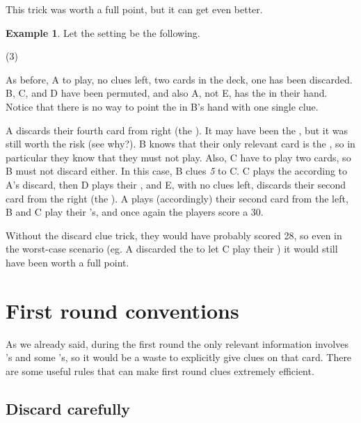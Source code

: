 \documentclass[a4paper]{article}
\theoremstyle{plain}
\theoremstyle{definition}
\newtheorem{example}[theorem]{Example}
\begin{document}
This trick was worth a full point, but it can get even better. 

\begin{example}
	
	Let the setting be the following.
	
	\begin{tasks}(3)
		\task[+]      
		\task[A]    
		\task[B]    
		\task[C]    
		\task[D]    
		\task[E]    
	\end{tasks}
	
	As before, A to play, no clues left, two cards in the deck, one  has been discarded. B, C, and D have been permuted, and also A, not E, has the  in their hand. Notice that there is no way to point the  in B's hand with one single clue.
	
	A discards their fourth card from right (the ). It may have been the , but it was still worth the risk (see why?). B knows that their only relevant card is the , so in particular they know that they must not play. Also, C have to play two cards, so B must not discard either. In this case, B clues \textit{5} to C. C plays the  according to A's discard, then D plays their , and E, with no clues left, discards their second card from the right (the ). A plays (accordingly) their second card from the left, B and C play their 's, and once again the players score a 30.
\end{example}

Without the discard clue trick, they would have probably scored 28, so even in the worst-case scenario (eg. A discarded the  to let C play their ) it would still have been worth a full point.

\section{First round conventions}
\label{firstround}

As we already said, during the first round the only relevant information involves 's and some 's, so it would be a waste to explicitly give clues on that card. There are some useful rules that can make first round clues extremely efficient.

\subsection{Discard carefully}
\end{document}
